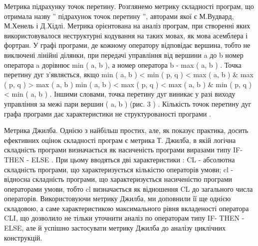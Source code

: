 Метрика підрахунку точок перетину.
Розглянемо метрику складності програм, що отримала назву '' підрахунок точок перетину '', авторами якої є М.Вудвард, М.Хенель і Д.Хідлі. Метрика орієнтована на аналіз програм, при створенні яких використовувалося неструктурні кодування на таких мовах, як мова асемблера і фортран.
У графі програми, де кожному оператору відповідає вершина, тобто не виключені лінійні ділянки, при передачі управління від вершини a до b номер оператора a дорівнює min ( a, b ), а номер оператора b - max ( a, b ) . Точка перетину дуг з'являється, якщо
min ( a, b ) \textless{} min ( p, q ) \textless{} max ( a, b ) \& max ( p, q ) \textgreater{} max ( a, b ) \textbar{}
min ( a, b ) \textless{} max ( p, q ) \textless{} max ( a, b ) \& min ( p, q ) \textless{} min ( a, b ) .
Іншими словами, точка перетину дуг виникає у разі виходу управління за межі пари вершин ( a, b ) (рис. 3 ) .
Кількість точок перетину дуг графа програми дає характеристики не структурованості програми .

Метрика Джилба.
Однією з найбільш простих, але, як показує практика, досить ефективних оцінок складності програм є метрика Т. Джилба, в якій логічна складність програми визначається як насиченість програми виразами типу IF- THEN - ELSE . При цьому вводяться дві характеристики : CL - абсолютна складність програми, що характеризується кількістю операторів умови; cl - відносна складність програми, що характеризується насиченістю програми операторами умови, тобто cl визначається як відношення CL до загального числа операторів.
Використовуючи метрику Джилба, ми доповнили її ще однією складовою, а саме характеристикою максимального рівня вкладеності оператора CLI, що дозволило не тільки уточнити аналіз по операторам типу IF- THEN - ELSE, але й успішно застосувати метрику Джилба до аналізу циклічних конструкцій.

